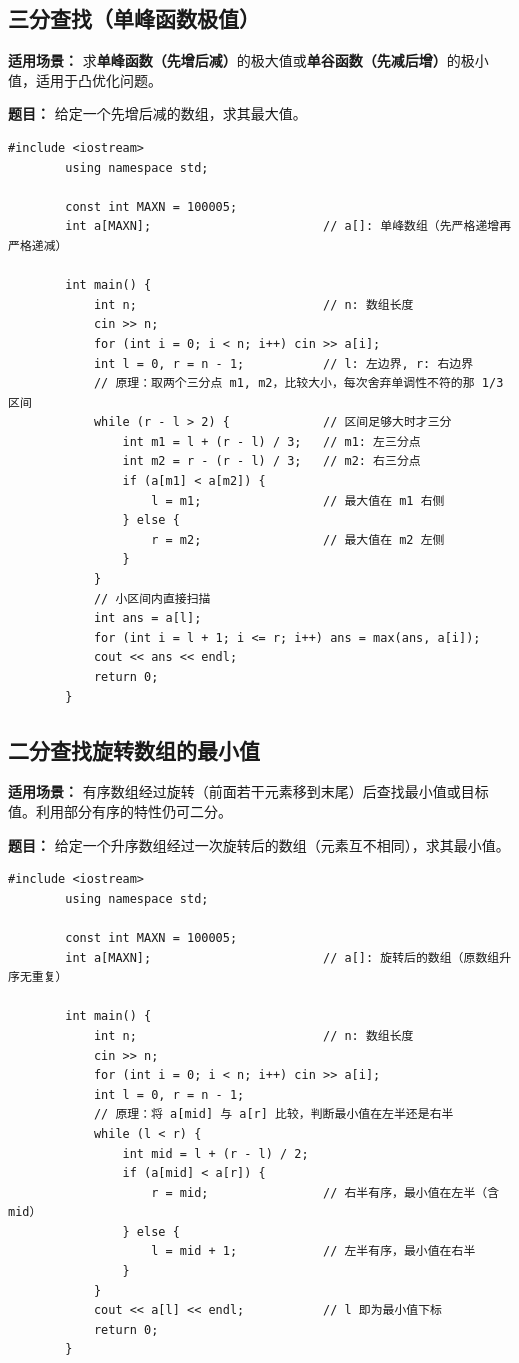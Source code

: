 \documentclass[12pt,a4paper]{ctexart}
\begin{document}
	\subsection{三分查找（单峰函数极值）}
	\textbf{适用场景：} 求\textbf{单峰函数（先增后减）}的极大值或\textbf{单谷函数（先减后增）}的极小值，适用于凸优化问题。
	
	\textbf{题目：} 给定一个先增后减的数组，求其最大值。
	
	\begin{lstlisting}[caption={三分查找——求单峰数组最大值}]
		#include <iostream>
		using namespace std;
		
		const int MAXN = 100005;
		int a[MAXN];                        // a[]: 单峰数组（先严格递增再严格递减）
		
		int main() {
			int n;                          // n: 数组长度
			cin >> n;
			for (int i = 0; i < n; i++) cin >> a[i];
			int l = 0, r = n - 1;           // l: 左边界, r: 右边界
			// 原理：取两个三分点 m1, m2，比较大小，每次舍弃单调性不符的那 1/3 区间
			while (r - l > 2) {             // 区间足够大时才三分
				int m1 = l + (r - l) / 3;   // m1: 左三分点
				int m2 = r - (r - l) / 3;   // m2: 右三分点
				if (a[m1] < a[m2]) {
					l = m1;                 // 最大值在 m1 右侧
				} else {
					r = m2;                 // 最大值在 m2 左侧
				}
			}
			// 小区间内直接扫描
			int ans = a[l];
			for (int i = l + 1; i <= r; i++) ans = max(ans, a[i]);
			cout << ans << endl;
			return 0;
		}
	\end{lstlisting}
	
	\subsection{二分查找旋转数组的最小值}
	\textbf{适用场景：} 有序数组经过旋转（前面若干元素移到末尾）后查找最小值或目标值。利用部分有序的特性仍可二分。
	
	\textbf{题目：} 给定一个升序数组经过一次旋转后的数组（元素互不相同），求其最小值。
	
	\begin{lstlisting}[caption={二分查找——旋转有序数组中的最小值}]
		#include <iostream>
		using namespace std;
		
		const int MAXN = 100005;
		int a[MAXN];                        // a[]: 旋转后的数组（原数组升序无重复）
		
		int main() {
			int n;                          // n: 数组长度
			cin >> n;
			for (int i = 0; i < n; i++) cin >> a[i];
			int l = 0, r = n - 1;
			// 原理：将 a[mid] 与 a[r] 比较，判断最小值在左半还是右半
			while (l < r) {
				int mid = l + (r - l) / 2;
				if (a[mid] < a[r]) {
					r = mid;                // 右半有序，最小值在左半（含 mid）
				} else {
					l = mid + 1;            // 左半有序，最小值在右半
				}
			}
			cout << a[l] << endl;           // l 即为最小值下标
			return 0;
		}
	\end{lstlisting}
	
\end{document}
